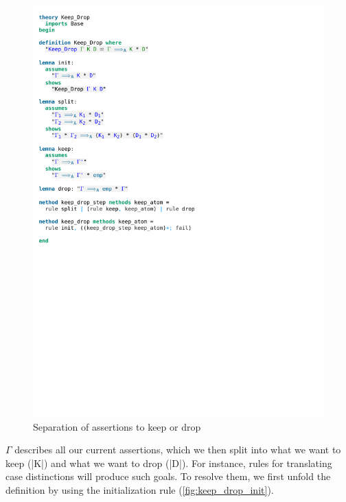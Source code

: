 \begin{figure}[htpb]
    \includegraphics[trim={0 26,2cm 0 2,4cm}, clip, width=1.00\textwidth]{figures/Theory_Keep_Drop.pdf}
    \caption[Separation of assertions to keep or drop]{Separation of assertions to keep or drop}
    \label{fig:keep_drop}
\end{figure}

\noindent $\Gamma$ describes all our current assertions, which we then split into what we want to keep (|K|) and what we want to drop (|D|). For instance, rules for translating case distinctions will produce such goals. To resolve them, we first unfold the definition by using the initialization rule (\autoref{fig:keep_drop_init}).

